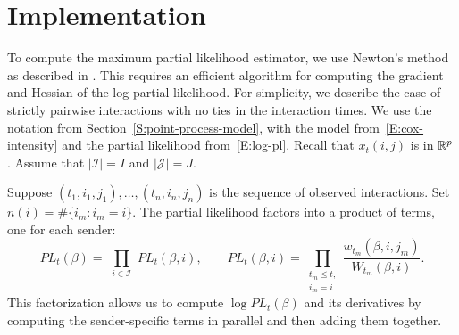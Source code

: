 \documentclass[final]{statsoc}
\begin{document}
\appendix

\section{Implementation}\label{S:implementation}

To compute the maximum partial likelihood estimator, we use Newton's
method as described in \citet{boyd2004convex}.
This requires an efficient algorithm for
computing the gradient and Hessian of the log partial likelihood.  For
simplicity, we describe the case of strictly pairwise interactions with no
ties in the interaction times.  We use the notation from
Section~\ref{S:point-process-model}, with
the model from~\eqref{E:cox-intensity} and the partial likelihood
from~\eqref{E:log-pl}.  Recall that $x_t(i,j)$ is in $\mathbb{R}^p$.
Assume that $|\mathcal{I}| = I$ and $|\mathcal{J}| = J$.

Suppose $(t_1, i_1, j_1), \ldots, (t_n, i_n, j_n)$ is the sequence of observed
interactions.  Set $n(i) = \#\{ i_m : i_m = i \}.$
The partial likelihood factors into a product of terms, one for each sender:
\begin{equation*}
    \mathit{PL}_t(\beta)
        =
        \,\,
        \prod_{i \in \mathcal{I}}
            \,\,
            \mathit{PL}_t(\beta, i),
    \qquad
    \mathit{PL}_t(\beta, i)
        =
        \!\!\!\!
        \prod_{\substack{t_m \leq t, \\ i_m = i}}
            \!\!\!
            \frac{w_{t_m} (\beta, i, j_m)}
                 {W_{t_m}(\beta, i)}.
\end{equation*}
This factorization allows us to compute $\log \mathit{PL}_t(\beta)$ and
its derivatives by computing the sender-specific terms in parallel and
then adding them together.
\end{document}
